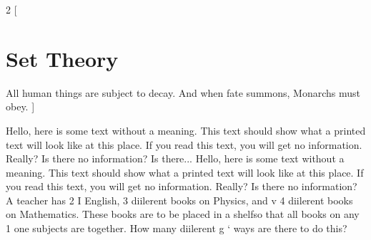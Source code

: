 \documentclass[14pt]{article}
\begin{document}
\begin{multicols}{2}
[
\section{Set Theory}
All human things are subject to decay. And when fate summons, Monarchs must obey.
]

Hello, here is some text without a meaning.  This text should show what 
a printed text will look like at this place.
If you read this text, you will get no information.  Really?  Is there 
no information?  Is there...
Hello, here is some text without a meaning.  This text should show what 
a printed text will look like at this place.
If you read this text, you will get no information.  Really?  Is there 
no information? A teacher has 2
I English, 3 diilerent books on Physics, and
v 4 diilerent books on Mathematics. These books
are to be placed in a shelfso that all books on any
1 one subjects are together. How many diilerent
g ‘ ways are there to do this?
\end{multicols}
 
\end{document}
